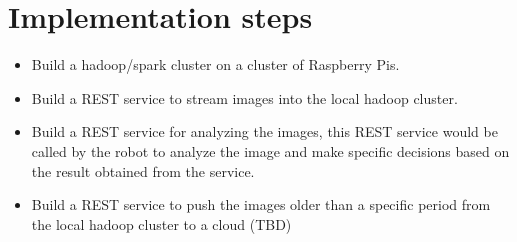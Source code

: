 \section{Implementation steps}
\begin{itemize}
	\item Build a hadoop/spark cluster on a cluster of Raspberry Pis.
	\item Build a REST service to stream images into the local hadoop cluster.
	\item Build a REST service for analyzing the images, this REST service would be called by the robot to analyze the image and make specific decisions based on the result obtained from the service.
	\item Build a REST service to push the images older than a specific period from the local hadoop cluster to a cloud (TBD)
\end{itemize} 


 

